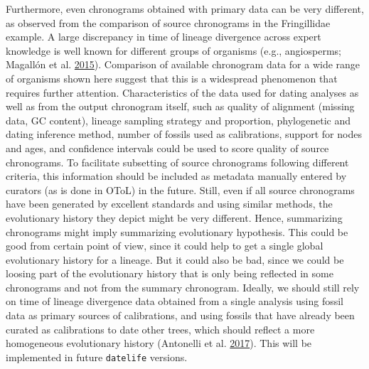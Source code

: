\documentclass[]{article}
\begin{document}
Furthermore, even chronograms obtained with primary data can be very different, as observed from the comparison of source chronograms in the Fringillidae example.
A large discrepancy in time of lineage divergence across expert knowledge is well known for different groups of organisms (e.g., angiosperms; Magallón et al. \protect\hyperlink{ref-magallon2015metacalibrated}{2015}). Comparison of available chronogram data for a wide range of organisms shown here suggest that this is a widespread phenomenon that requires further attention.
Characteristics of the data used for dating analyses as well as from the output chronogram itself, such as quality of alignment (missing data, GC content), lineage sampling strategy and proportion, phylogenetic and dating inference method, number of fossils used as calibrations, support for nodes and ages, and confidence intervals could be used to score quality of source chronograms. To facilitate subsetting of source chronograms following different criteria, this information should be included as metadata manually entered by curators (as is done in OToL) in the future.
Still, even if all source chronograms have been generated by excellent standards and using similar methods, the evolutionary history they depict might be very different. Hence, summarizing chronograms might imply summarizing evolutionary hypothesis. This could be good from certain point of view, since it could help to get a single global evolutionary history for a lineage. But it could also be bad, since we could be loosing part of the evolutionary history that is only being reflected in some chronograms and not from the summary chronogram.
Ideally, we should still rely on time of lineage divergence data obtained from a single analysis using fossil data as primary sources of calibrations, and using fossils that have already been curated as calibrations to date other trees, which should reflect a more homogeneous evolutionary history (Antonelli et al. \protect\hyperlink{ref-antonelli2017supersmart}{2017}). This will be implemented in future \texttt{datelife} versions.
\end{document}
